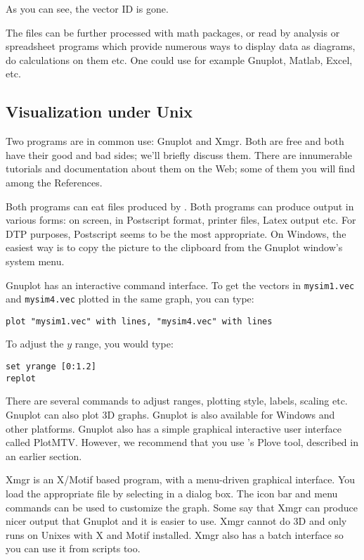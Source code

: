 As you can see, the vector ID is gone.

The files can be further processed with math packages, or read
by analysis or spreadsheet programs which provide numerous ways
to display data as diagrams, do calculations on them etc. One
could use for example Gnuplot, Matlab, Excel, etc.





\subsection{Visualization under Unix}

Two programs are in common use: Gnuplot and Xmgr. Both are free
and both have their good and bad sides; we'll briefly discuss
them. There are innumerable tutorials and documentation about
them on the Web; some of them you will find among the References.


Both programs can eat files produced by . Both
programs can produce output in various forms: on screen, in Postscript
format, printer files, Latex output etc. For DTP purposes, Postscript
seems to be the most appropriate. On Windows, the easiest way is to
copy the picture to the clipboard from the Gnuplot window's system
menu.


Gnuplot has an interactive command interface. To get the vectors in
\texttt{mysim1.vec} and \texttt{mysim4.vec} plotted in the same graph,
you can type:

\begin{verbatim}
plot "mysim1.vec" with lines, "mysim4.vec" with lines
\end{verbatim}

To adjust the $y$ range, you would type:

\begin{verbatim}
set yrange [0:1.2]
replot
\end{verbatim}


There are several commands to adjust ranges, plotting style, labels,
scaling etc. Gnuplot can also plot 3D graphs. Gnuplot
is also available for Windows and other platforms. Gnuplot also
has a simple graphical interactive user interface called PlotMTV.
However, we recommend that you use {\opp}'s Plove tool, described in
an earlier section.


Xmgr is an X/Motif based program, with a menu-driven
graphical interface. You load the appropriate file by selecting in a
dialog box. The icon bar and menu commands can be used to customize
the graph. Some say that Xmgr can produce nicer output that Gnuplot
and it is easier to use. Xmgr cannot do 3D and only runs on Unixes
with X and Motif installed. Xmgr also has a batch interface so you can
use it from scripts too.



